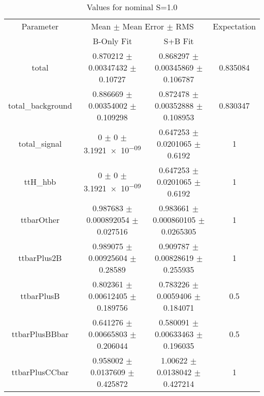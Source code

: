\begin{table}
\centering
\caption{Values for nominal S=1.0}
\begin{tabular}{cccc}
\toprule
Parameter & \multicolumn{2}{c}{Mean $\pm$ Mean Error $\pm$ RMS} & Expectation\\
 & B-Only Fit & S+B Fit & \\
\midrule
total & \num{0.870212} $\pm$ \num{0.00347432} $\pm$ \num{0.10727} & \num{0.868297} $\pm$ \num{0.00345869} $\pm$ \num{0.106787} & \num{0.835084}\\
total\_background & \num{0.886669} $\pm$ \num{0.00354002} $\pm$ \num{0.109298} & \num{0.872478} $\pm$ \num{0.00352888} $\pm$ \num{0.108953} & \num{0.830347}\\
total\_signal & \num{0} $\pm$ \num{0} $\pm$ \num{3.1921e-09} & \num{0.647253} $\pm$ \num{0.0201065} $\pm$ \num{0.6192} & \num{1}\\
ttH\_hbb & \num{0} $\pm$ \num{0} $\pm$ \num{3.1921e-09} & \num{0.647253} $\pm$ \num{0.0201065} $\pm$ \num{0.6192} & \num{1}\\
ttbarOther & \num{0.987683} $\pm$ \num{0.000892054} $\pm$ \num{0.027516} & \num{0.983661} $\pm$ \num{0.000860105} $\pm$ \num{0.0265305} & \num{1}\\
ttbarPlus2B & \num{0.989075} $\pm$ \num{0.00925604} $\pm$ \num{0.28589} & \num{0.909787} $\pm$ \num{0.00828619} $\pm$ \num{0.255935} & \num{1}\\
ttbarPlusB & \num{0.802361} $\pm$ \num{0.00612405} $\pm$ \num{0.189756} & \num{0.783226} $\pm$ \num{0.0059406} $\pm$ \num{0.184071} & \num{0.5}\\
ttbarPlusBBbar & \num{0.641276} $\pm$ \num{0.00665803} $\pm$ \num{0.206044} & \num{0.580091} $\pm$ \num{0.00633463} $\pm$ \num{0.196035} & \num{0.5}\\
ttbarPlusCCbar & \num{0.958002} $\pm$ \num{0.0137609} $\pm$ \num{0.425872} & \num{1.00622} $\pm$ \num{0.0138042} $\pm$ \num{0.427214} & \num{1}\\
\bottomrule
\end{tabular}
\end{table}